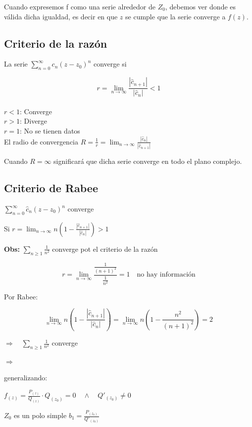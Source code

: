 \documentclass[a4paper,12pt]{article}
\begin{document}
Cuando expresemos f como una serie alrededor de $Z_0$, debemos ver donde es válida dicha igualdad, es decir en que $z$ se cumple que la serie converge a $f(z)$.

\subsection{Criterio de la razón}

La serie $\sum\limits_{n=0}^{\infty} c_n (z - z_0)^n$ converge si


\[ r = \lim_{n \to \infty} \frac{|\hat{c}_{n+1}|}{|\hat{c}_n|} < 1 \]
\\$r < 1$: Converge\\
$r > 1$: Diverge\\
$r = 1$: No se tienen datos\\

El radio de convergencia \quad $R = \frac{1}{r} = \lim_{n \to \infty} \frac{|\hat{c}_n|}{|\hat{c}_{n+1}|}$

Cuando $R = \infty$ significará que dicha serie converge en todo el plano complejo.

\subsection{Criterio de Rabee}

$\sum_{n=0}^{\infty} \hat{c}_n (z - z_0)^n$ converge

Si \quad $r = \lim_{n \to \infty} n \left(1 - \frac{|\hat{c}_{n+1}|}{|\hat{c}_n|}\right) > 1$

\textbf{Obs:} $\sum_{n \geq 1} \frac{1}{n^2}$ converge pot el criterio de la razón

\[ r = \lim_{n \to \infty} \frac{\frac{1}{(n+1)^2}}{\frac{1}{n^2}} = 1 \quad \text{no hay información} \]

Por Rabee:

\[ \lim_{n \to \infty} n \left(1 - \frac{|\hat{c}_{n+1}|}{|\hat{c}_n|}\right) = \lim_{n \to \infty} n \left(1 - \frac{n^2}{(n+1)^2}\right) = 2 \]

$\Rightarrow \quad \sum_{n \geq 1} \frac{1}{n^2}$ converge

$\Rightarrow$

generalizando:

$f_{(z)} = \frac{P_{(z)}}{Q_{(z)}} \cdot Q_{(z_0)} = 0 \quad \wedge \quad Q'_{(z_0)} \neq 0$

$Z_0$ es un polo simple \quad $b_1 = \frac{P_{(z_0)}}{Q'_{(z_0)}}$
\end{document}
